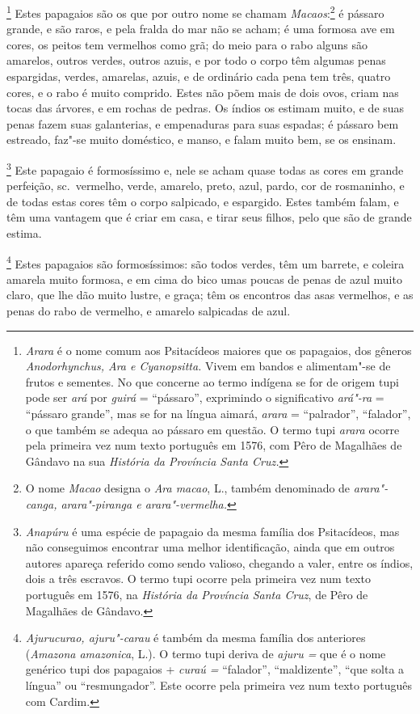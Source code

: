 \begin{linenumbers}
\footnote{ \textit{Arara} é o nome comum aos
Psitacídeos maiores que os papagaios, dos gêneros
\textit{Anodorhynchus, Ara e Cyanopsitta.} Vivem em bandos e
alimentam"-se de frutos e sementes. No que concerne ao termo indígena se
for de origem tupi pode ser \textit{ará} por \textit{guirá} = ``pássaro'', 
exprimindo o significativo \textit{ará"-ra} = ``pássaro
grande'', mas se for na língua aimará, \textit{arara} = ``palrador'',
``falador'', o que também se adequa ao pássaro em questão. O termo tupi
\textit{arara} ocorre pela primeira vez num texto português em 1576,
com Pêro de Magalhães de Gândavo na sua \textit{História da Província 
Santa Cruz.} } Estes papagaios são os que por outro nome se
chamam \textit{Macaos}:\footnote{ O nome \textit{Macao} designa o
\textit{Ara macao}, L., também denominado de \textit{arara"-canga,
arara"-piranga e arara"-vermelha.}} é pássaro grande, e são raros, e pela
fralda do mar não se acham; é uma formosa ave em cores, os peitos tem
vermelhos como grã; do meio para o rabo alguns são amarelos, outros
verdes, outros azuis, e por todo o corpo têm algumas penas espargidas,
verdes, amarelas, azuis, e de ordinário cada pena tem três, quatro
cores, e o rabo é muito comprido. Estes não põem mais de dois ovos,
criam nas tocas das árvores, e em rochas de pedras. Os índios os
estimam muito, e de suas penas fazem suas galanterias, e empenaduras
para suas espadas; é pássaro bem estreado, faz"-se muito doméstico, e
manso, e falam muito bem, se os ensinam.

\footnote{ \textit{Anapúru} é uma espécie de
papagaio da mesma família dos Psitacídeos, mas não conseguimos
encontrar uma melhor identificação, ainda que em outros autores apareça
referido como sendo valioso, chegando a valer, entre os índios, dois a
três escravos. O termo tupi ocorre pela primeira vez num texto
português em 1576, na \textit{História da Província Santa Cruz}, de
Pêro de Magalhães de Gândavo.} Este papagaio é formosíssimo e, nele
se acham quase todas as cores em grande perfeição, sc.~vermelho,
verde, amarelo, preto, azul, pardo, cor de rosmaninho, e de todas estas
cores têm o corpo salpicado, e espargido. Estes também falam, e têm uma
vantagem que é criar em casa, e tirar seus filhos, pelo que são de grande estima. 

\footnote{ \textit{Ajurucurao, ajuru"-carau} é
também da mesma família dos anteriores (\textit{Amazona amazonica}, L.). 
O termo tupi deriva de \textit{ajuru =} que é o nome genérico
tupi dos papagaios + \textit{curaú =} ``falador'', ``maldizente'', ``que
solta a língua'' ou ``resmungador''. Este ocorre pela primeira vez num
texto português com Cardim.} Estes papagaios são formosíssimos: 
são todos verdes, têm um barrete, e coleira amarela
muito formosa, e em cima do bico umas poucas de penas de azul muito
claro, que lhe dão muito lustre, e graça; têm os encontros das asas
vermelhos, e as penas do rabo de vermelho, e amarelo salpicadas de azul.


\end{linenumbers}
